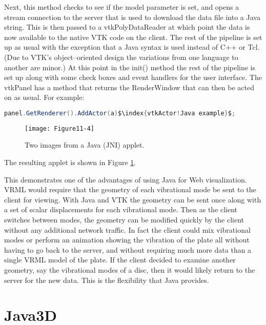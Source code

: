 Next, this method checks to see if the model parameter is set, and opens a stream connection to the server that is used to download the data file into a Java string. This is then passed to a vtkPolyDataReader at which point the data is now available to the native VTK code on the client. The rest of the pipeline is set up as usual with the exception that a Java syntax is used instead of C++ or Tcl. (Due to VTK's object--oriented design the variations from one language to another are minor.) At this point in the init() method the rest of the pipeline is set up along with some check boxes and event handlers for the user interface. The vtkPanel has a method that returns the RenderWindow that can then be acted on as usual. For example:

\begin{lstlisting}[language=Java, caption={}, numbers=none, frame=none, escapechar=\$]
panel.GetRenderer().AddActor(a)$\index{vtkActor!Java example}$;
\end{lstlisting}

\begin{figure}[!htb]
  \centering
  \texttt{[image: Figure11-4]}\\
  \caption{Two images from a Java (JNI) applet.}\label{fig:Figure11-4}
\end{figure}


The resulting applet is shown in Figure \ref{fig:Figure11-4}.

This demonstrates one of the advantages of using Java for Web visualization. VRML would require that the geometry of each vibrational mode be sent to the client for viewing. With Java and VTK the geometry can be sent once along with a set of scalar displacements for each vibrational mode. Then as the client switches between modes, the geometry can be modified quickly by the client without any additional network traffic. In fact the client could mix vibrational modes or perform an animation showing the vibration of the plate all without having to go back to the server, and without requiring much more data than a single VRML model of the plate. If the client decided to examine another geometry, say the vibrational modes of a disc, then it would likely return to the server for the new data. This is the flexibility that Java provides.

\section{Java3D}

